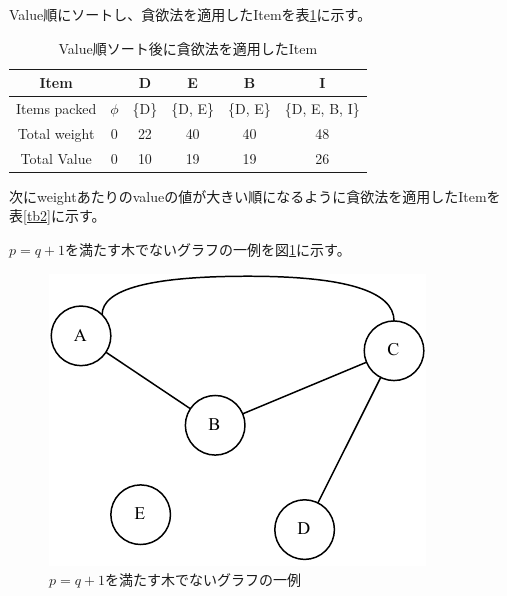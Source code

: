 
\begin{description}
  \setlength{\parskip}{0cm} %
  \setlength{\itemsep}{0cm} %
  \item[1 回答] Value順にソートし、貪欲法を適用したItemを表\ref{tb1}に示す。

  \begin{table}[ht]
  \centering
  \caption{Value順ソート後に貪欲法を適用したItem}
  \begin{tabular}[t]{cccccc}
  \toprule
  Item&&D&E&B&I\\
  \midrule
  Items packed&$\phi$&\{D\}&\{D, E\}&\{D, E\}&\{D, E, B, I\}\\
  Total weight&0&22&40&40&48\\
  Total Value&0&10&19&19&26\\
  \bottomrule
  \end{tabular}
  \label{tb1}
  \end{table}%
  次にweightあたりのvalueの値が大きい順になるように貪欲法を適用したItemを表\ref{tb2}に示す。
  
  \begin{table}[ht]
  \centering
  \caption{weightあたりのvalueの値が大きい順になるように貪欲法を適用したItem}
    \end{table}%
  \end{description}


\begin{description}
  \setlength{\parskip}{0cm} %
  \setlength{\itemsep}{0cm} %
  \item[4 回答] $p=q+1$を満たす木でないグラフの一例を図\ref{g1}に示す。
  \begin{figure}[h]
    \begin{center}
      \includegraphics[width=.45\linewidth]{img/graph1.pdf}
    \end{center}
    \caption{$p=q+1$を満たす木でないグラフの一例}
    \label{g1}
  \end{figure}
\end{description}